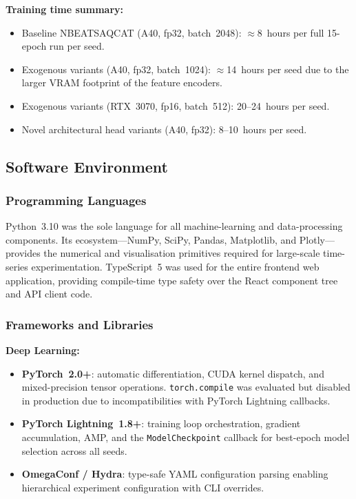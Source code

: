 \textbf{Training time summary:}
\begin{itemize}
  \item Baseline NBEATSAQCAT (A40, fp32, batch~2048): $\approx$8~hours per
        full 15-epoch run per seed.
  \item Exogenous variants (A40, fp32, batch~1024): $\approx$14~hours per
        seed due to the larger VRAM footprint of the feature encoders.
  \item Exogenous variants (RTX~3070, fp16, batch~512): 20--24~hours per seed.
  \item Novel architectural head variants (A40, fp32): 8--10~hours per seed.
\end{itemize}

\subsection{Software Environment}
\label{subsec:software}

\subsubsection{Programming Languages}
\label{subsubsec:languages}

Python~3.10 was the sole language for all machine-learning and
data-processing components.  Its ecosystem---NumPy, SciPy, Pandas,
Matplotlib, and Plotly---provides the numerical and visualisation
primitives required for large-scale time-series experimentation.
TypeScript~5 was used for the entire frontend web application, providing
compile-time type safety over the React component tree and API client code.

\subsubsection{Frameworks and Libraries}
\label{subsubsec:frameworks}

\textbf{Deep Learning:}
\begin{itemize}
  \item \textbf{PyTorch~2.0+}: automatic differentiation, CUDA kernel
        dispatch, and mixed-precision tensor operations.
        \texttt{torch.compile} was evaluated but disabled in production
        due to incompatibilities with PyTorch Lightning callbacks.
  \item \textbf{PyTorch Lightning~1.8+}: training loop orchestration,
        gradient accumulation, AMP, and the \texttt{ModelCheckpoint}
        callback for best-epoch model selection across all seeds.
  \item \textbf{OmegaConf / Hydra}: type-safe YAML configuration parsing
        enabling hierarchical experiment configuration with CLI overrides.
\end{itemize}

